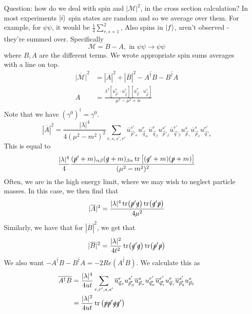 Question: how do we deal with spin and $ | \mathcal{ M } | ^ 2 $, 
in the cross section calculation? 
In most experiments $ \ket{ i } $ spin states are random 
and so we average over them. For example, for 
$ \psi \psi $, it would be $ \frac{1}{4 } \sum_{ r , s = 1 } ^ 2 $, 
Also spins in $ \ket{ f } $, aren't observed - they're summed over. 
Specifically 
\[
 \mathcal{ M } = B - A , \text{ in } \psi \psi \to \psi \psi 
\] where $ B , A $ are the different terms. 
We wrote appropriate spin sums averages with a line on top. 
\begin{align*}
	\overline{ | \mathcal{ M } | } ^ 2 &=  | \overline{ A } | ^ 2 
	+ | \overline{ B } | ^ 2 - \overline{ A ^ \dagger B } - 
	\overline{ B ^ \dagger A } \\
	A &=  \frac{\lambda ^ 2 \left[  \overline{u  }_{ \vec{p} ' } ^ s 
	\cdot  u_{ \vec{q} } ^ r  \right] \left[  
\overline{ u } _{ \vec{q} ' } ^{ r ' } \cdot  u_{ \vec{p} } ^ s \right]}{
\mu ^ 2- \mu ^ 2+ i \epsilon } \\
\end{align*}
Note that we have $ ( \gamma ^ 0 ) ^ \dagger  = \gamma ^ 0 $. 
 \[
	 | \overline{ A } | ^ 2 = \frac{ | \lambda | ^ 4  }{ 4 ( \mu ^ 2 - m ^ 2 ) ^ 2  } 
 \sum_{ r , s , s' , r ' } \overline{u }_{ \vec{p} ' _ \alpha } ^{ s ' } 
 u_{ \vec{q} _ \alpha } ^ r \overline{ u } _{ \vec{q} _ \beta } ^ r 
 u_{ \vec{p} ' _ \beta } ^{ s ' } \overline{u }_{ \vec{q} ' _ \beta } ^{ r ' } 
 u_{ \vec{p} _ \gamma } ^{ s } \overline{ u }_{ \vec{p} _ \delta } ^ s 
 u_{ \vec{q}' _ \delta } ^{ r ' }
\]  This 
is equal to 
\[
	\frac{ | \lambda |  ^ 4 }{ 4 } \frac{( \slashed{p}' + m)_{ \alpha \beta } 
	( \slashed{q} + m )_{ \beta \alpha } \tr \left[  
( \slashed{q}' + m ) (\slashed{p} + m )  \right] }{ ( \mu ^ 2 - m ^ 2 ) ^  2}
\] Often, we are in the high energy limit, 
where we may wish to neglect particle masses. In this 
case, we then find that 
\[	| \overline{ A } | ^ 2 = \frac{ | \lambda | ^ 4 \tr ( 
	\slashed{p} ' \slashed{q} ) \tr (\slashed{q} ' \slashed{p} ) }{4 \mu ^ 2 }
\] Similarly, we have that for $ | \overline{ B  } | ^ 2 $, 
we get that 
\[
 | \overline{ B } | ^ 2 = \frac{  | \lambda | ^ 2 }{ 4 t ^ 2 }
 \tr ( \slashed{q} ' \slashed{q} ) \tr ( \slashed{p} ' \slashed{p} ) 
\] We also want $  - \overline{ A ^ \dagger B  }  - \overline{ B ^ \dagger A }  = 
- 2 Re \overline{ ( A ^ \dagger B ) } $. 
We calculate this as 
\begin{align*}
	\overline{ A ^ \dagger B  } &  = \frac{ | \lambda | ^ 4 }{ 4 u t} 
	\sum_{ r , r' , s, s ' } \overline{u } _{ \vec{q} _ \beta } ^ r 
	u _{ \vec{p} ' _ \beta }^{ s' } \overline{ u } _{ \vec{p} _ \alpha } ^ s 
	u _{ \vec{q} ' _ \alpha } ^{ r '} \overline{ u } _{ \vec{q}' _ \gamma } ^{ r ' } 
	u_{ \vec{q} _ \gamma } ^ r \overline{ u } _{ \vec{p} ' _ \delta } ^{ s' } 
	u _{ \vec{p} _ \delta } ^ s \\
				    &=  \frac{|\lambda | ^ 2 }{ 4 ut } \tr \left(  
				    \slashed{p} \slashed{p} ' 
			    \slashed{q} \slashed{q}' \right)  \\
\end{align*} 

